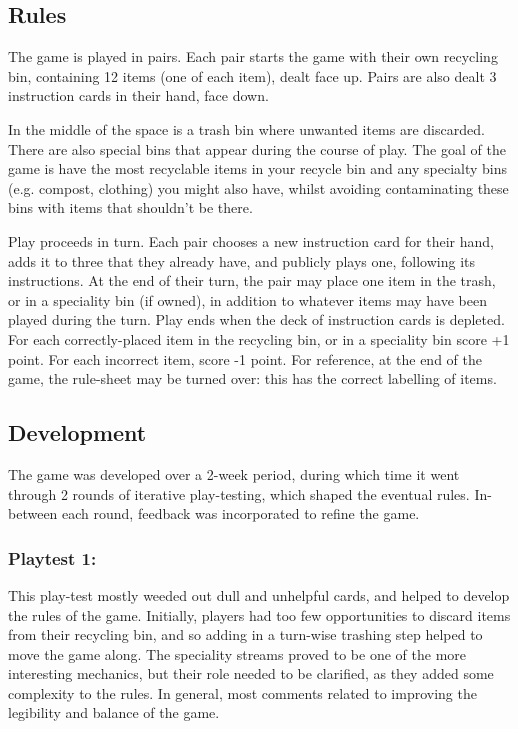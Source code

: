 \documentclass[nofonts,nols,justified,nobib]{tufte-book}
\begin{document}
\subsection*{Rules }

The game is played in pairs. Each pair starts the game with their own recycling bin, containing 12 items (one of each item), dealt face up. Pairs are also dealt 3 instruction cards in their hand, face down. 

In the middle of the space is a trash bin where unwanted items are discarded. There are also special bins that appear during the course of play. 
The goal of the game is have the most recyclable items in your recycle bin and any specialty bins (e.g. compost, clothing) you might also have, whilst avoiding contaminating these bins with items that shouldn't be there. 

Play proceeds in turn. Each pair chooses a new instruction card for their hand, adds it to three that they already have, and publicly plays one, following its instructions. At the end of their turn, the pair may place one item in the trash, or in a speciality bin (if owned), in addition to whatever items may have been played during the turn. 
Play ends when the deck of instruction cards is depleted. For each correctly-placed item in the recycling bin, or in a speciality bin score +1 point. For each incorrect item, score -1 point. For reference, at the end of the game, the rule-sheet may be turned over: this has the correct labelling of items. 


\subsection*{Development}

The game was developed over a 2-week period, during which time it went through 2 rounds of iterative play-testing, which shaped the eventual rules. In-between each round, feedback was incorporated to refine the game.

\subsubsection*{Playtest 1:}
This play-test mostly weeded out dull and unhelpful cards, and helped to develop the rules of the game. Initially, players had too few opportunities to discard items from their recycling bin, and so adding in a turn-wise trashing step helped to move the game along. The speciality streams proved to be one of the more interesting mechanics, but their role needed to be clarified, as they added some complexity to the rules. In general, most comments related to improving the legibility and balance of the game.
\end{document}
